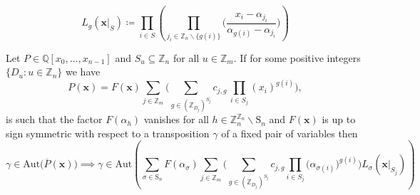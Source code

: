 \[
L_{g}(\mathbf{x}|_{S})\coloneq\prod_{i\in S}\left(\prod_{j_{i}\in\mathbb{Z}_{n}\backslash\{g(i)\}}\bigg(\frac{x_{i}-\alpha_{j_{i}}}{\alpha_{g(i)}-\alpha_{j_{i}}}\bigg)\right)
\]
\begin{lemma} \label{lem:symmetrization Lemma}
Let $P\in\mathbb{Q}\left[x_{0},\ldots,x_{n-1}\right]$
and $S_{u}\subseteq\mathbb{Z}_{n}$ for all $u\in\mathbb{Z}_{m}$. If for some positive integers $\{D_{u}:u\in\mathbb{Z}_{n}\}$ we have
\begin{equation}
P(\mathbf{x})=F(\mathbf{x})\sum_{j\in\mathbb{Z}_{m}}\big(\sum_{g\in(\mathbb{Z}_{D_{j}})^{S_{j}}}c_{j,g}\,\prod_{i\in S_{j}}(x_{i})^{g(i)}\big),
\end{equation}
is such that the factor $F(\alpha_{h})$ vanishes for all $h\in \mathbb{Z}_{n}^{\mathbb{Z}_{n}}\backslash\text{S}_{n}$ and $F(\mathbf{x})$ is up to sign symmetric with respect to a transposition $\gamma$ of a fixed pair of variables then
\[
\gamma\in\textrm{Aut}\bigg(\overline{P}(\mathbf{x})\bigg)\implies\gamma\in\textrm{Aut}\left(\sum_{\sigma\in\text{S}_{n}}F(\alpha_{\sigma})\sum_{j\in\mathbb{Z}_{m}}\bigg(\sum_{g\in(\mathbb{Z}_{D_{j}})^{S_{j}}}c_{j,g}\prod_{i\in S_{j}}\big(\alpha_{\sigma(i)}\big)^{g(i)}\bigg)L_{\sigma}(\mathbf{x}|_{S_{j}})\right)
\]
\end{lemma}
